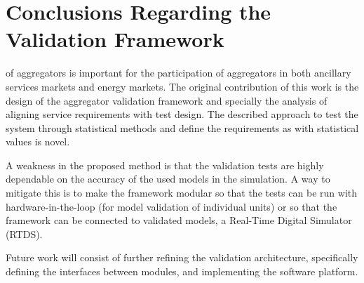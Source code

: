\section{Conclusions Regarding the Validation Framework}
 of aggregators is important for the participation of aggregators in both ancillary services markets and energy markets. The original contribution of this work is the design of the aggregator validation framework and specially the analysis of aligning service requirements with test design. The described approach to test the system through statistical methods and define the requirements as with statistical values is novel.

A weakness in the proposed method is that the validation tests are highly dependable on the accuracy of the used models in the simulation. A way to mitigate this is to make the framework modular so that the tests can be run with hardware-in-the-loop (for model validation of individual units) or so that the framework can be connected to validated models, \eg a Real-Time Digital Simulator (RTDS). 

Future work will consist of further refining the validation architecture, specifically defining the interfaces between modules, and implementing the software platform.
